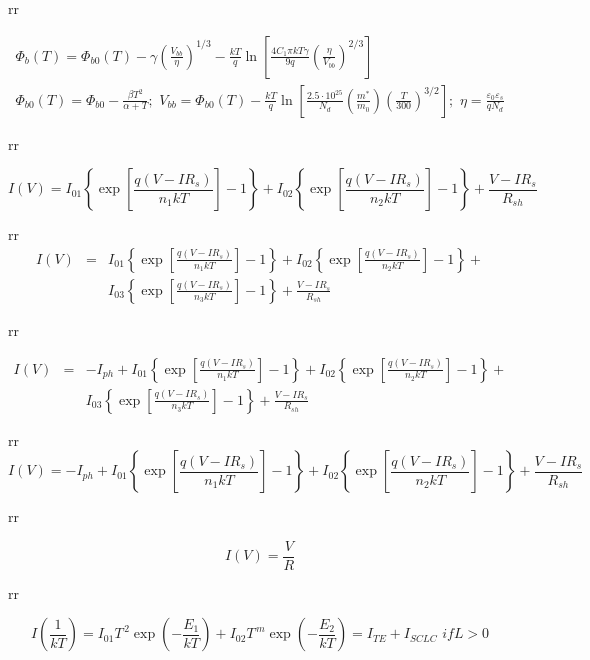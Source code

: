 \documentclass[14pt]{article}
\numberwithin{equation}{part}
\begin{document}
rr

\begin{eqnarray*}
  \Phi_b(T)= \Phi_{b0}(T)-\gamma\left(\frac{V_{bb}}{\eta}\right)^{1/3}-\frac{kT}{q}\ln\left[
   \frac{4C_1\pi kT\gamma}{9q}\left(\frac{\eta}{V_{bb}}\right)^{2/3}\right]
 \\
   \Phi_{b0}(T)=\Phi_{b0}-\frac{\beta T^2}{\alpha+T};\,\,
   V_{bb}= \Phi_{b0}(T)-\frac{kT}{q}\ln\left[\frac{2.5\cdot10^{25}}{N_d}\left(\frac{m^*}{m_0}\right)
     \left(\frac{T}{300}\right)^{3/2}\right];\,\,
   \eta=\frac{\varepsilon_0\varepsilon_s}{qN_d}
\end{eqnarray*}

rr

\begin{equation*}
    I(V)=I_{01}\left\{\exp \left[\frac{q(V-IR_s)}{n_1kT}\right]-1\right\}+I_{02}\left\{\exp \left[\frac{q(V-IR_s)}{n_2kT}\right]-1\right\}+\frac{V-IR_s}{R_{sh}}
\end{equation*}

rr
\begin{eqnarray*}
  I(V)&=&I_{01}\left\{\exp \left[\frac{q(V-IR_s)}{n_1kT}\right]-1\right\}+I_{02}\left\{\exp \left[\frac{q(V-IR_s)}{n_2kT}\right]-1\right\}+ \\
   &&I_{03}\left\{\exp \left[\frac{q(V-IR_s)}{n_3kT}\right]-1\right\}+\frac{V-IR_s}{R_{sh}}
\end{eqnarray*}

rr

\begin{eqnarray*}
  I(V)&=&-I_{ph}+I_{01}\left\{\exp \left[\frac{q(V-IR_s)}{n_1kT}\right]-1\right\}+I_{02}\left\{\exp \left[\frac{q(V-IR_s)}{n_2kT}\right]-1\right\}+ \\
   &&I_{03}\left\{\exp \left[\frac{q(V-IR_s)}{n_3kT}\right]-1\right\}+\frac{V-IR_s}{R_{sh}}
\end{eqnarray*}

rr
\begin{equation*}
    I(V)=-I_{ph}+I_{01}\left\{\exp \left[\frac{q(V-IR_s)}{n_1kT}\right]-1\right\}+I_{02}\left\{\exp \left[\frac{q(V-IR_s)}{n_2kT}\right]-1\right\}+\frac{V-IR_s}{R_{sh}}
\end{equation*}

rr

\begin{equation*}
    I(V)=\frac{V}{R}
\end{equation*}

rr

\begin{equation*}
    I\left(\frac{1}{kT}\right)=I_{01}T^{\,2}\exp\left(-\frac{E_1}{kT}\right)+
       I_{02}T^{\,m}\exp\left(-\frac{E_2}{kT}\right)=I_{TE}+I_{SCLC} \,\, if L>0
\end{equation*}
\end{document}
